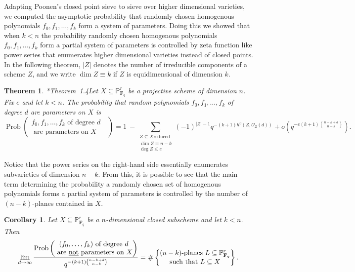 \documentclass[10pt,reqno]{amsart}
\newtheorem{theorem}[lemma]{Theorem}
\newtheorem{cor}[lemma]{Corollary}
\theoremstyle{remark}
\newcommand{\Prob}{\operatorname{Prob}}
\newcommand{\fF}{\mathbf F}
\renewcommand{\O}{\mathcal{O}}
\renewcommand{\P}{\mathbb{P}}
\begin{document}
Adapting Poonen's closed point sieve to sieve over higher dimensional varieties, we computed the asymptotic probability that randomly chosen homogenous polynomials $f_{0},f_{1},\ldots,f_{k}$ form a system of parameters. Doing this we showed that when $k<n$ the probability randomly chosen homogenous polynomials $f_{0},f_{1},\ldots,f_{k}$ form a partial system of parameters is controlled by zeta function like power series that enumerates higher dimensional varieties instead of closed points. In the following theorem, $|Z|$ denotes the number of irreducible components of a scheme $Z$, and we write $\dim Z \equiv k$ if $Z$ is equidimensional of dimension $k$. 

\begin{theorem}\cite{bruceErman-sop}*{Theorem~1.4}\label{thm:main finite field}
Let $X\subseteq \P^r_{\fF_q}$ be a projective scheme of dimension $n$. Fix $e$ and let $k<n$. The probability that random polynomials $f_0,f_1,\dots,f_k$ of degree $d$ are parameters on $X$ is
\[
\Prob\left(\begin{matrix}f_0,f_1,\dots,f_{k} \text{ of degree $d$ } \\ \text{ are parameters on $X$}\end{matrix}\right) = 1 \ - 
\sum_{\begin{smallmatrix}Z\subseteq X \text{reduced} \\ \dim Z \equiv n-k\\ \deg Z \leq e  \end{smallmatrix}}(-1)^{|Z|-1}q^{-(k+1)h^0(Z,\O_Z(d))}+ o\left(q^{-e(k+1)\binom{n-k+d}{n-k}}\right).
\]
\end{theorem}

Notice that the power series on the right-hand side essentially enumerates subvarieties of dimension $n-k$. From this, it is possible to see that the main term determining the probability a randomly chosen set of homogenous polynomials forms a partial system of parameters is controlled by the number of $(n-k)$-planes contained in $X$. 

\begin{cor}\cite{bruceErman-sop}\label{cor:error}
Let $X\subseteq \P^r_{\fF_q}$ be a $n$-dimensional closed subscheme and let $k<n$.  Then
\[
\lim_{d\to \infty} \frac{\Prob\left(\begin{matrix}(f_0,\dots,f_{k}) \text{ of degree $d$} \\ \text{ are \underline{not} parameters on $X$}\end{matrix}\right)} {q^{-(k+1)\binom{n-k+d}{n-k}}} = \#\left\{\begin{matrix}\text{$(n-k)$-planes } L\subseteq \P^r_{\fF_q}\\\text{such that }  L\subseteq X\end{matrix}\right\}.
\]
\end{cor} 
\end{document}
